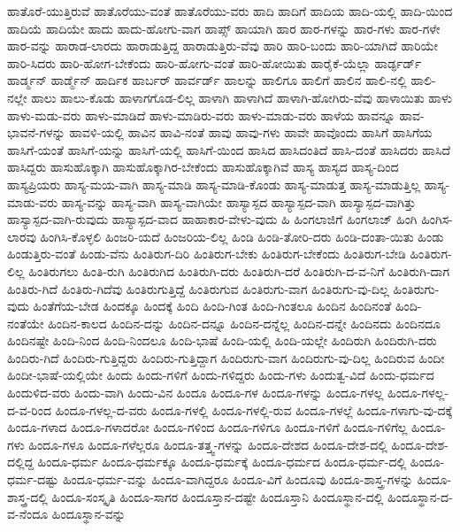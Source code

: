 {ಹಾತೊರೆ-ಯುತ್ತಿರುವೆ
ಹಾತೊರೆಯು-ವಂತೆ
ಹಾತೊರೆಯು-ವರು
ಹಾದಿ
ಹಾದಿಗೆ
ಹಾದಿಯ
ಹಾದಿ-ಯಲ್ಲಿ
ಹಾದಿ-ಯಿಂದ
ಹಾದಿಯೆ
ಹಾದಿಯೇ
ಹಾದು
ಹಾದು-ಹೋಗು-ವಾಗ
ಹಾಪ್ಸ್
ಹಾಯಾಗಿ
ಹಾರ
ಹಾರ-ಗಳನ್ನು
ಹಾರ-ಗಳು
ಹಾರ-ಗಳೇ
ಹಾರ-ವನ್ನು
ಹಾರಾಡ-ಲಾರದು
ಹಾರಾಡುತ್ತಿದ್ದ
ಹಾರಾಡುತ್ತಿರು-ವೆವು
ಹಾರಿ
ಹಾರಿ-ಬಂದು
ಹಾರಿ-ಯಾಗಿದೆ
ಹಾರಿಯೇ
ಹಾರಿ-ಸಿದರು
ಹಾರಿ-ಹೋಗ-ಬೇಕೆಂದು
ಹಾರಿ-ಹೋಗು-ವಂತೆ
ಹಾರಿ-ಹೋಯಿತು
ಹಾರೈಕೆ-ಯೆಲ್ಲಾ
ಹಾರ್ಡ್ಫರ್ಡ್
ಹಾರ್ಡ್ಮನ್
ಹಾರ್ಡ್ಮೆನ್
ಹಾರ್ದಿಕ
ಹಾರ್ಬರ್
ಹಾರ್ವರ್ಡ್
ಹಾಲನ್ನು
ಹಾಲಿಗೂ
ಹಾಲಿಗೆ
ಹಾಲಿನ
ಹಾಲಿ-ನಲ್ಲಿ
ಹಾಲಿ-ನಲ್ಲೇ
ಹಾಲು
ಹಾಲು-ಕೊಡು
ಹಾಳಾಗಗೊಡ-ಲಿಲ್ಲ
ಹಾಳಾಗಿ
ಹಾಳಾಗಿದೆ
ಹಾಳಾಗಿ-ಹೋಗಿರು-ವೆವು
ಹಾಳಾಯಿತು
ಹಾಳು
ಹಾಳು-ಮಡು-ವರು
ಹಾಳು-ಮಾಡಿದೆ
ಹಾಳು-ಮಾಡಿರು-ವರು
ಹಾಳು-ಮಾಡು-ವರು
ಹಾಳೆಯ
ಹಾವನ್ನೂ
ಹಾವ-ಭಾವನೆ-ಗಳನ್ನು
ಹಾವಳಿ-ಯಲ್ಲಿ
ಹಾವಿನ
ಹಾವಿ-ನಂತೆ
ಹಾವು
ಹಾವು-ಗಳು
ಹಾವೇ
ಹಾವೊಂದು
ಹಾಸಿಗೆ
ಹಾಸಿಗೆಯ
ಹಾಸಿಗೆ-ಯಂತೆ
ಹಾಸಿಗೆ-ಯನ್ನು
ಹಾಸಿಗೆ-ಯಲ್ಲಿ
ಹಾಸಿಗೆ-ಯಿಂದ
ಹಾಸಿದ
ಹಾಸಿದಂತಿದೆ
ಹಾಸಿ-ದಂತೆ
ಹಾಸಿದರು
ಹಾಸಿದೆ
ಹಾಸಿದ್ದರು
ಹಾಸುಹೊಕ್ಕಾಗಿ
ಹಾಸುಹೊಕ್ಕಾಗಿರ-ಬೇಕೆಂದು
ಹಾಸುಹೊಕ್ಕಾಗಿವೆ
ಹಾಸ್ಯ
ಹಾಸ್ಯದ
ಹಾಸ್ಯ-ದಿಂದ
ಹಾಸ್ಯಪ್ರಿಯರು
ಹಾಸ್ಯ-ಮಯ-ವಾಗಿ
ಹಾಸ್ಯ-ಮಾಡಿ
ಹಾಸ್ಯ-ಮಾಡಿ-ಕೊಂಡು
ಹಾಸ್ಯ-ಮಾಡುತ್ತ
ಹಾಸ್ಯ-ಮಾಡುತ್ತಿಲ್ಲ
ಹಾಸ್ಯ-ಮಾಡು-ವರು
ಹಾಸ್ಯ-ವನ್ನು
ಹಾಸ್ಯ-ವಾಗಿ
ಹಾಸ್ಯ-ವಾಗಿಯೇ
ಹಾಸ್ಯಾಸ್ಪದ
ಹಾಸ್ಯಾಸ್ಪದ-ವಾಗಿ
ಹಾಸ್ಯಾಸ್ಪದ-ವಾಗಿತ್ತು
ಹಾಸ್ಯಾಸ್ಪದ-ವಾಗಿ-ರುವುದು
ಹಾಸ್ಯಾಸ್ಪದ-ವಾದ
ಹಾಹಾಕಾರ-ವೇಳು-ವುದು
ಹಿ
ಹಿಂಗಲಾಜಿಗೆ
ಹಿಂಗಲಾಜ್
ಹಿಂಗಿ
ಹಿಂಗಿಸ-ಲಾರವು
ಹಿಂಗಿಸಿ-ಕೊಳ್ಳಲಿ
ಹಿಂಜರಿ-ಯದೆ
ಹಿಂಜರಿಯ-ಲಿಲ್ಲ
ಹಿಂಡಿ
ಹಿಂಡಿ-ತೋರಿ-ದರು
ಹಿಂಡಿ-ದಂತಾ-ಯಿತು
ಹಿಂಡು
ಹಿಂಡುತ್ತಿರು-ವಂತೆ
ಹಿಂಡು-ವೆನು
ಹಿಂತಿರುಗ-ದಿರಿ
ಹಿಂತಿರುಗ-ಬೇಕು
ಹಿಂತಿರುಗ-ಬೇಕೆಂದು
ಹಿಂತಿರುಗ-ಬೇಡಿ
ಹಿಂತಿರುಗ-ಲಿಲ್ಲ
ಹಿಂತಿರುಗಲು
ಹಿಂತಿ-ರುಗಿ
ಹಿಂತಿರುಗಿದ
ಹಿಂತಿರುಗಿ-ದರು
ಹಿಂತಿರುಗಿ-ದರೆ
ಹಿಂತಿರುಗಿ-ದ-ವ-ನಿಗೆ
ಹಿಂತಿರುಗಿ-ದಾಗ
ಹಿಂತಿರು-ಗಿದೆ
ಹಿಂತಿರು-ಗಿದೆವು
ಹಿಂತಿರುಗುತ್ತಿದ್ದೆ
ಹಿಂತಿರುಗುವ
ಹಿಂತಿರುಗು-ವಾಗ
ಹಿಂತಿರುಗು-ವು-ದಿಲ್ಲ
ಹಿಂತಿರುಗು-ವುದು
ಹಿಂತೆಗೆಯ-ಬೇಡ
ಹಿಂದಕ್ಕೂ
ಹಿಂದಕ್ಕೆ
ಹಿಂದಿ
ಹಿಂದಿ-ಗಿಂತ
ಹಿಂದಿ-ಗಿಂತಲೂ
ಹಿಂದಿನ
ಹಿಂದಿನಂತೆ
ಹಿಂದಿ-ನಂತೆಯೇ
ಹಿಂದಿನ-ಕಾಲದ
ಹಿಂದಿನ-ದನ್ನು
ಹಿಂದಿನ-ದನ್ನೂ
ಹಿಂದಿನ-ದನ್ನೆಲ್ಲ
ಹಿಂದಿನ-ದನ್ನೇ
ಹಿಂದಿನದು
ಹಿಂದಿನದೂ
ಹಿಂದಿನಷ್ಟೇ
ಹಿಂದಿ-ನಿಂದ
ಹಿಂದಿ-ನಿಂದಲೂ
ಹಿಂದಿ-ಭಾಷೆ
ಹಿಂದಿ-ಯಲ್ಲಿ
ಹಿಂದಿ-ಯಲ್ಲೇ
ಹಿಂದಿರುಗಿ
ಹಿಂದಿರುಗಿ-ದರು
ಹಿಂದಿರು-ಗಿದೆ
ಹಿಂದಿರು-ಗುತ್ತಿದ್ದರು
ಹಿಂದಿರು-ಗುತ್ತಿದ್ದಾಗ
ಹಿಂದಿರುಗು-ವಾಗ
ಹಿಂದಿರುಗು-ವು-ದಿಲ್ಲ
ಹಿಂದಿರುವ
ಹಿಂದೀ
ಹಿಂದೀ-ಭಾಷೆ-ಯಲ್ಲಿಯೇ
ಹಿಂದು
ಹಿಂದು-ಗಳಿಗೆ
ಹಿಂದು-ಗಳಿದ್ದರು
ಹಿಂದು-ಗಳು
ಹಿಂದುತ್ವ-ವಿದೆ
ಹಿಂದು-ಧರ್ಮದ
ಹಿಂದುಳಿದ-ವರು
ಹಿಂದು-ವಾಗಿ
ಹಿಂದು-ವಿನ
ಹಿಂದೂ
ಹಿಂದೂ-ಗಳ
ಹಿಂದೂ-ಗಳನ್ನು
ಹಿಂದೂ-ಗಳಲ್ಲ
ಹಿಂದೂ-ಗಳಲ್ಲ-ದ-ವ-ರಿಂದ
ಹಿಂದೂ-ಗಳಲ್ಲ-ದ-ವರು
ಹಿಂದೂ-ಗಳಲ್ಲಿ
ಹಿಂದೂ-ಗಳಲ್ಲಿ-ರುವ
ಹಿಂದೂ-ಗಳಲ್ಲೆ
ಹಿಂದೂ-ಗಳಾಗು-ವು-ದಕ್ಕೆ
ಹಿಂದೂ-ಗಳಾದ
ಹಿಂದೂ-ಗಳಾದರೋ
ಹಿಂದೂ-ಗಳಿಂದ
ಹಿಂದೂ-ಗಳಿಗೂ
ಹಿಂದೂ-ಗಳಿಗೆ
ಹಿಂದೂ-ಗಳಿಗೆಲ್ಲ
ಹಿಂದೂ-ಗಳು
ಹಿಂದೂ-ಗಳೂ
ಹಿಂದೂ-ಗಳೆಲ್ಲರೂ
ಹಿಂದೂ-ತತ್ತ್ವ-ಗಳನ್ನು
ಹಿಂದೂ-ದೇಶದ
ಹಿಂದೂ-ದೇಶ-ದಲ್ಲಿ
ಹಿಂದೂ-ದೇಶ-ದಲ್ಲಿದ್ದ
ಹಿಂದೂ-ಧರ್ಮ
ಹಿಂದೂ-ಧರ್ಮಕ್ಕೂ
ಹಿಂದೂ-ಧರ್ಮಕ್ಕೆ
ಹಿಂದೂ-ಧರ್ಮದ
ಹಿಂದೂ-ಧರ್ಮ-ದಲ್ಲಿ
ಹಿಂದೂ-ಧರ್ಮ-ದಷ್ಟು
ಹಿಂದೂ-ಧರ್ಮ-ವನ್ನು
ಹಿಂದೂ-ವಾಗಿದ್ದರೂ
ಹಿಂದೂ-ವಿಗೆ
ಹಿಂದೂವು
ಹಿಂದೂ-ಶಾಸ್ತ್ರ-ಗಳನ್ನು
ಹಿಂದೂ-ಶಾಸ್ತ್ರ-ದಲ್ಲಿ
ಹಿಂದೂ-ಸಂಸ್ಕೃತಿ
ಹಿಂದೂ-ಸಾಗರ
ಹಿಂದೂಸ್ತಾನ-ದಷ್ಟೇ
ಹಿಂದೂಸ್ತಾನಿ
ಹಿಂದೂಸ್ಥಾನ-ದಲ್ಲಿ
ಹಿಂದೂಸ್ಥಾನ-ದ-ವ-ನೆಂದೂ
ಹಿಂದೂಸ್ಥಾನ-ವನ್ನು
}
